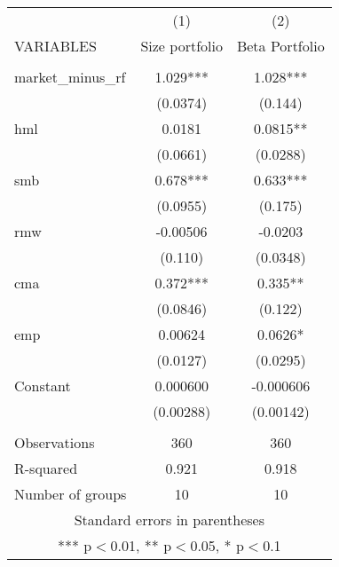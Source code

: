 \begin{tabular}{lcc} \hline
 & (1) & (2) \\
VARIABLES & Size portfolio & Beta Portfolio \\ \hline
 &  &  \\
market\_minus\_rf & 1.029*** & 1.028*** \\
 & (0.0374) & (0.144) \\
hml & 0.0181 & 0.0815** \\
 & (0.0661) & (0.0288) \\
smb & 0.678*** & 0.633*** \\
 & (0.0955) & (0.175) \\
rmw & -0.00506 & -0.0203 \\
 & (0.110) & (0.0348) \\
cma & 0.372*** & 0.335** \\
 & (0.0846) & (0.122) \\
emp & 0.00624 & 0.0626* \\
 & (0.0127) & (0.0295) \\
Constant & 0.000600 & -0.000606 \\
 & (0.00288) & (0.00142) \\
 &  &  \\
Observations & 360 & 360 \\
R-squared & 0.921 & 0.918 \\
 Number of groups & 10 & 10 \\ \hline
\multicolumn{3}{c}{ Standard errors in parentheses} \\
\multicolumn{3}{c}{ *** p$<$0.01, ** p$<$0.05, * p$<$0.1} \\
\end{tabular}
